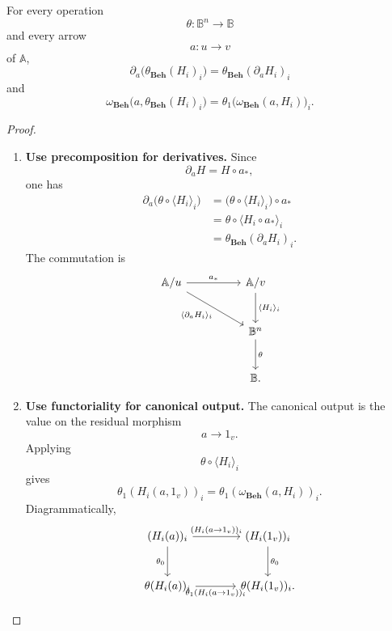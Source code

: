 \begin{lemma}
\label{lem:operations-preserve-derivatives-output}
    For every operation
    \[
        \theta:\mathbb B^n\to\mathbb B
    \]
    and every arrow
    \[
        a:u\to v
    \]
    of \(\mathbb A\),
    \[
        \partial_a\bigl(\theta_{\mathbf{Beh}}(H_i)_i\bigr)
        =
        \theta_{\mathbf{Beh}}(\partial_aH_i)_i
    \]
    and
    \[
        \omega_{\mathbf{Beh}}
        \bigl(a,\theta_{\mathbf{Beh}}(H_i)_i\bigr)
        =
        \theta_1\bigl(\omega_{\mathbf{Beh}}(a,H_i)\bigr)_i.
    \]
\end{lemma}

\begin{proof}
    \leavevmode
    \begin{enumerate}
        \item \textbf{Use precomposition for derivatives.}
        Since
        \[
            \partial_aH=H\circ a_*,
        \]
        one has
        \[
        \begin{aligned}
            \partial_a\bigl(\theta\circ\langle H_i\rangle_i\bigr)
            &=
            \bigl(\theta\circ\langle H_i\rangle_i\bigr)\circ a_* \\
            &=
            \theta\circ\langle H_i\circ a_*\rangle_i \\
            &=
            \theta_{\mathbf{Beh}}(\partial_aH_i)_i.
        \end{aligned}
        \]
        The commutation is
        \[
        \begin{tikzcd}[column sep=huge, row sep=large]
            \mathbb A/u
                \arrow[r, "a_*"]
                \arrow[dr, "{\langle \partial_aH_i\rangle_i}"']
            &
            \mathbb A/v
                \arrow[d, "{\langle H_i\rangle_i}"]
            \\
            &
            \mathbb B^n
                \arrow[d, "\theta"]
            \\
            &
            \mathbb B .
        \end{tikzcd}
        \]

        \item \textbf{Use functoriality for canonical output.}
        The canonical output is the value on the residual morphism
        \[
            a\to 1_v.
        \]
        Applying
        \[
            \theta\circ\langle H_i\rangle_i
        \]
        gives
        \[
            \theta_1(H_i(a,1_v))_i
            =
            \theta_1(\omega_{\mathbf{Beh}}(a,H_i))_i.
        \]
        Diagrammatically,
        \[
        \begin{tikzcd}[column sep=large, row sep=large]
            (H_i(a))_i
                \arrow[r, "{(H_i(a\to 1_v))_i}"]
                \arrow[d, "\theta_0"']
            &
            (H_i(1_v))_i
                \arrow[d, "\theta_0"]
            \\
            \theta(H_i(a))_i
                \arrow[r, "{\theta_1(H_i(a\to 1_v))_i}"']
            &
            \theta(H_i(1_v))_i .
        \end{tikzcd}
        \]


\end{enumerate}
\end{proof}
